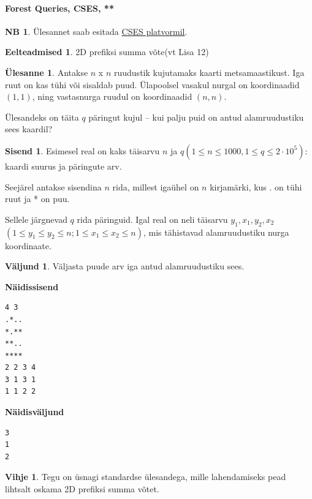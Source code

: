 \documentclass{trkut}
\theoremstyle{definition}
\newtheorem*{prereq}{Eelteadmised}
\newtheorem*{extra}{NB}
\newtheorem*{vihje}{Vihje}
\newtheorem*{Input}{Sisend}
\newtheorem*{Output}{Väljund}
\newtheorem*{Text}{Ülesanne}
\begin{document}
\paragraph{Forest Queries, CSES, **}
\begin{extra}
Ülesannet saab esitada \href{https://cses.fi/problemset/task/1652}{CSES platvormil}.
\end{extra}
\begin{prereq}
2D prefiksi summa võte(vt Lisa 12)
\end{prereq}
\begin{Text}
Antakse $n$ x $n$ ruudustik kujutamaks kaarti metsamaastikust. Iga ruut on kas tühi või sisaldab puud. Ülapoolsel vasakul nurgal on koordinaadid $(1, 1)$, ning vastasnurga ruudul on koordinaadid $(n, n)$.

Ülesandeks on täita $q$ päringut kujul -- kui palju puid on antud alamruudustiku sees kaardil?

\parencite{forest}
\end{Text}
\begin{Input}
Esimesel real on kaks täisarvu $n$ ja $q$$(1\le n\le 1000, 1\le q\le 2\cdot 10^5)$: kaardi suurus ja päringute arv.

Seejärel antakse sisendina $n$ rida, millest igaühel on $n$ kirjamärki, kus . on tühi ruut ja * on puu.

Sellele järgnevad $q$ rida päringuid. Igal real on neli täisarvu $y_1, x_1, y_2, x_2$$(1\le y_1\le y_2\le n; 1\le x_1\le x_2\le n)$, mis tähistavad alamruudustiku nurga koordinaate.

\end{Input}

\begin{Output}
Väljasta puude arv iga antud alamruudustiku sees.
\end{Output}



\textbf{Näidissisend}

\begin{verbatim}
4 3
.*..
*.**
**..
****
2 2 3 4
3 1 3 1
1 1 2 2
\end{verbatim}

\textbf{Näidisväljund}

\begin{verbatim}
3
1
2
\end{verbatim}


\begin{vihje}
Tegu on üsnagi standardse ülesandega, mille lahendamiseks pead lihtsalt oskama 2D prefiksi summa võtet.
\end{vihje}
\end{document}

